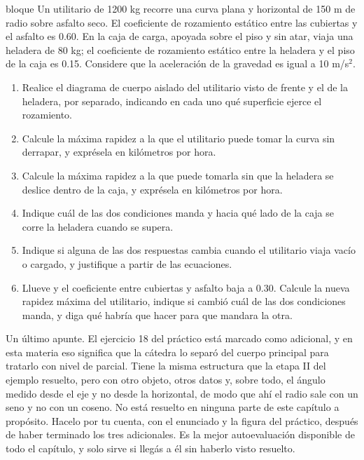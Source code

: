 \documentclass[11pt,openany]{book}
\begin{document}
\begin{ejercicio}{bloque}
Un utilitario de 1200 kg recorre una curva plana y horizontal de 150 m de radio sobre asfalto seco. El coeficiente de rozamiento estático entre las cubiertas y el asfalto es 0.60. En la caja de carga, apoyada sobre el piso y sin atar, viaja una heladera de 80 kg; el coeficiente de rozamiento estático entre la heladera y el piso de la caja es 0.15. Considere que la aceleración de la gravedad es igual a 10 m/s$^2$.
\begin{enumerate}[label=(\alph*), leftmargin=1.7em, itemsep=1pt, topsep=3pt]
  \item Realice el diagrama de cuerpo aislado del utilitario visto de frente y el de la heladera, por separado, indicando en cada uno qué superficie ejerce el rozamiento.
  \item Calcule la máxima rapidez a la que el utilitario puede tomar la curva sin derrapar, y exprésela en kilómetros por hora.
  \item Calcule la máxima rapidez a la que puede tomarla sin que la heladera se deslice dentro de la caja, y exprésela en kilómetros por hora.
  \item Indique cuál de las dos condiciones manda y hacia qué lado de la caja se corre la heladera cuando se supera.
  \item Indique si alguna de las dos respuestas cambia cuando el utilitario viaja vacío o cargado, y justifique a partir de las ecuaciones.
  \item Llueve y el coeficiente entre cubiertas y asfalto baja a 0.30. Calcule la nueva rapidez máxima del utilitario, indique si cambió cuál de las dos condiciones manda, y diga qué habría que hacer para que mandara la otra.
\end{enumerate}
\end{ejercicio}

Un último apunte. El ejercicio 18 del práctico está marcado como adicional, y en esta materia eso significa que la cátedra lo separó del cuerpo principal para tratarlo con nivel de parcial. Tiene la misma estructura que la etapa II del ejemplo resuelto, pero con otro objeto, otros datos y, sobre todo, el ángulo medido desde el eje y no desde la horizontal, de modo que ahí el radio sale con un seno y no con un coseno. No está resuelto en ninguna parte de este capítulo a propósito. Hacelo por tu cuenta, con el enunciado y la figura del práctico, después de haber terminado los tres adicionales. Es la mejor autoevaluación disponible de todo el capítulo, y solo sirve si llegás a él sin haberlo visto resuelto.
\end{document}
